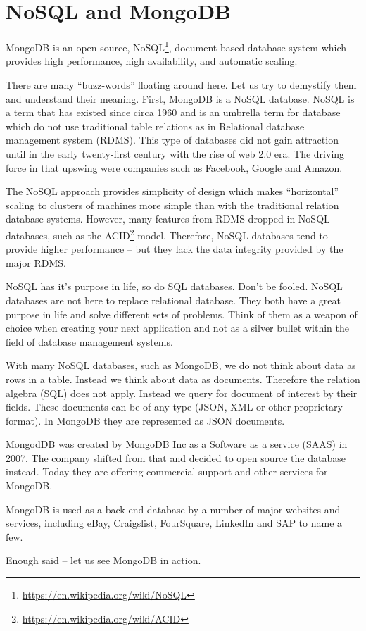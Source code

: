 \section{NoSQL and MongoDB}\label{sec:nosql_and_mongodb}
MongoDB is an open source, NoSQL\footnote{\url{https://en.wikipedia.org/wiki/NoSQL}}, document-based database system which provides high performance, high availability, and automatic scaling.

There are many ``buzz-words'' floating around here. Let us try to demystify them and understand their meaning. First, MongoDB is a NoSQL database. NoSQL is a term that has existed since circa 1960 and is an umbrella term for database which do not use traditional table relations as in Relational database management system (RDMS). This type of databases did not gain attraction until in the early twenty-first century with the rise of web 2.0 era. The driving force in that upswing were companies such as Facebook, Google and Amazon.

The NoSQL approach provides simplicity of design which makes ``horizontal'' scaling to clusters of machines more simple than with the traditional relation database systems. However, many features from RDMS dropped in NoSQL databases, such as the ACID\footnote{\url{https://en.wikipedia.org/wiki/ACID}} model. Therefore, NoSQL databases tend to provide higher performance -- but they lack the data integrity provided by the major RDMS.

NoSQL has it's purpose in life, so do SQL databases. Don't be fooled. NoSQL databases are not here to replace relational database. They both have a great purpose in life and solve different sets of problems. Think of them as a weapon of choice when creating your next application and not as a silver bullet within the field of database management systems.

With many NoSQL databases, such as MongoDB, we do not think about data as rows in a table. Instead we think about data as documents. Therefore the relation algebra (SQL) does not apply. Instead we query for document of interest by their fields. These documents can be of any type (JSON, XML or other proprietary format). In MongoDB they are represented as JSON documents.

MongodDB was created by MongoDB Inc as a Software as a service (SAAS) in 2007. The company shifted from that and decided to open source the database instead. Today they are offering commercial support and other services for MongoDB.

MongoDB is used as a back-end database by a number of major websites and services, including eBay, Craigslist, FourSquare, LinkedIn and SAP to name a few.

Enough said -- let us see MongoDB in action.
